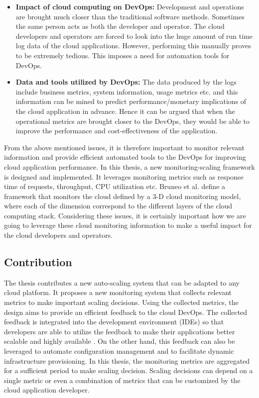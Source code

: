 \documentclass[article,type=msc,colorback,12pt,accentcolor=tud8b,table]{tudthesis}
\begin{document}
\begin{itemize}
	\item \textbf{Impact of cloud computing on DevOps:}
	Development and operations are brought much closer than the traditional software methods. Sometimes the same person acts as both the developer and operator. The cloud developers and operators are forced to look into the huge amount of run time log data of the cloud applications. However, performing this manually proves to be extremely tedious. This imposes a need for automation tools for DevOps.
	
	\item \textbf{Data and tools utilized by DevOps:}
	The data produced by the logs include business metrics, system information, usage metrics etc. and this information can be mined to predict performance/monetary implications of the cloud application in advance. Hence it can be argued that when the operational metrics are brought closer to the DevOps, they would be able to improve the performance and cost-effectiveness of the application.
	
\end{itemize}
From the above mentioned issues, it is therefore important to monitor relevant information and provide efficient automated tools to the DevOps for improving cloud application performance. In this thesis, a new monitoring-scaling framework is designed and implemented. It leverages monitoring metrics such as response time of requests, throughput, CPU utilization etc. Bruneo et al.\cite{bruneo2015framework} define a framework that monitors the cloud defined by a 3-D cloud monitoring model, where each of the dimension correspond to the different layers of the cloud computing stack. Considering these issues, it is certainly important how we are going to leverage these cloud monitoring information to make a useful impact for the cloud developers and operators. 
 
	\subsection{Contribution}	
	
	The thesis contributes a new auto-scaling system that can be adapted to any cloud platform. It proposes a new monitoring system that collects relevant metrics to make important scaling decisions. Using the collected metrics, the design aims to provide an efficient feedback to the cloud DevOps. The collected feedback is integrated into the development environment (IDEs) so that developers are able to utilize the feedback to make their applications better scalable and highly available \cite{cito2015runtime}. On the other hand, this feedback can also be leveraged to automate configuration management and to facilitate dynamic infrastructure provisioning. In this thesis, the monitoring metrics are aggregated for a sufficient period to make scaling decision. Scaling decisions can depend on a single metric or even a combination of metrics that can be customized by the cloud application developer. 
	
\end{document}
